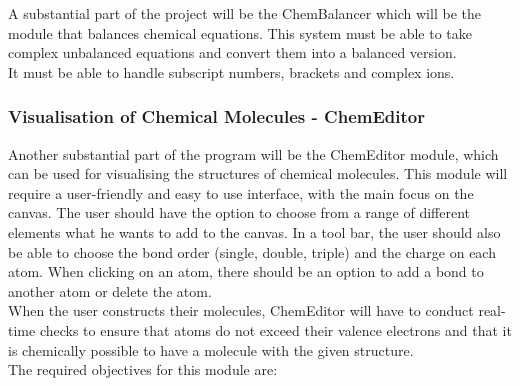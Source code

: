 \documentclass[a4paper,12pt]{article}
\begin{document}
A substantial part of the project will be the ChemBalancer which will be the module that balances chemical equations. This system must be able to take complex unbalanced equations and convert them into a balanced version.\\
It must be able to handle subscript numbers, brackets and complex ions.

\subsubsection{Visualisation of Chemical Molecules - ChemEditor}

Another substantial part of the program will be the ChemEditor module, which can be used for visualising the structures of chemical molecules. This module will require a user-friendly and easy to use interface, with the main focus on the canvas. The user should have the option to choose from a range of different elements what he wants to add to the canvas. In a tool bar, the user should also be able to choose the bond order (single, double, triple) and the charge on each atom. When clicking on an atom, there should be an option to add a bond to another atom or delete the atom.\\
When the user constructs their molecules, ChemEditor will have to conduct real-time checks to ensure that atoms do not exceed their valence electrons and that it is chemically possible to have a molecule with the given structure. \\
The required objectives for this module are:\\
\end{document}
